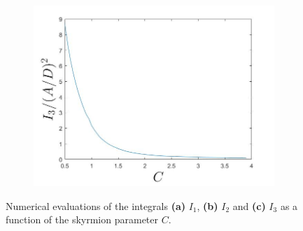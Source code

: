 \begin{figure}[h!]
\begin{subfigure}{.49\textwidth}
  \includegraphics[width=\linewidth]{Figures/I3Plot.jpg}
  \caption{}
  \label{fig:ThetaInt3}
\end{subfigure}
\caption{Numerical evaluations of the integrals \textbf{(a)} $I_1$, \textbf{(b)} $I_2$ and \textbf{(c)} $I_3$ as a function of the skyrmion parameter $C$.}
\label{fig:ThetaInts}
\end{figure}

